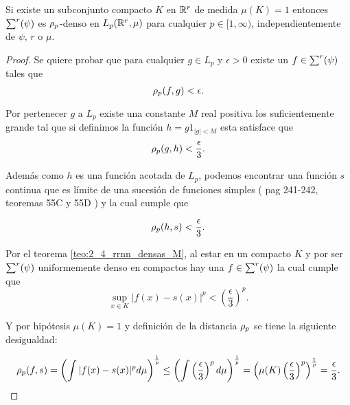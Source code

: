 \begin{corolario}\label{corolario:2_2_rrnn}
    Si existe un subconjunto compacto $K$ en $\mathbb{R}^r$ de medida
    $\mu(K) =1$ entonces $\sum^r (\psi)$ es $\rho_{p}$-denso en $L_p(\mathbb{R}^r, \mu)$
    para cualquier $p \in [1,\infty)$, independientemente de 
    $\psi$, $r$ o $\mu$.
\end{corolario}
\begin{proof}
    Se quiere probar que para cualquier $g \in L_p$ y 
    $\epsilon >0$ existe un $f \in \sum^r (\psi)$ tales que 
    \begin{equation}
        \rho_{p}(f,g) <\epsilon.
    \end{equation}   
    
    Por pertenecer $g$ a $L_p$ existe una constante $M$ real positiva
    los suficientemente grande 
    tal que si definimos la función $h =g 1_{|g|<M}$ esta satisface 
    que
    \begin{equation}\label{eq:corolario_2_2:h_compacto}
        \rho_{p}(g,h) < \frac{\epsilon}{3}.
    \end{equation}
    
    Además como $h$ es una función acotada de $L_p$, podemos encontrar
    una función $s$ continua que es límite de una sucesión de
    funciones simples 
    ( pag 241-242,  teoremas 55C y 55D \cite{nla.cat-vn1819421})
    y la cual cumple que 

    \begin{equation}\label{eq:corolario_2_2:s_continua}
        \rho_{p}(h,s) < \frac{\epsilon}{3}.
    \end{equation}

    Por el teorema \ref{teo:2_4_rrnn_densas_M}, al estar en un compacto $K$ y por ser $\sum^r (\psi)$ uniformemente
    denso en compactos hay una $f \in \sum^r (\psi)$ la cual cumple que
    \begin{equation}
        \sup_{x \in K} |f(x) -s(x)|^p 
        <
         \left( \frac{\epsilon}{3}\right) ^p.
    \end{equation}
    
    Y por hipótesis $\mu(K) =1$ y definición de la distancia $\rho_{p}$ 
    se tiene la siguiente desigualdad: 

    \begin{equation} \label{eq:corolario_2_2:cota_rrnn}
        \rho_{p}(f,s) = 
        \left(\int |f(x) - s(x)|^p d\mu \right)^\frac{1}{p}
        \leq 
        \left(\int  \left( \frac{\epsilon}{3}\right) ^p d\mu \right)^\frac{1}{p}
        = \left( \mu(K)  \left(\frac{\epsilon}{3} \right)^p\right) ^\frac{1}{p}
        = \frac{\epsilon}{3}.
    \end{equation}


\end{proof}
